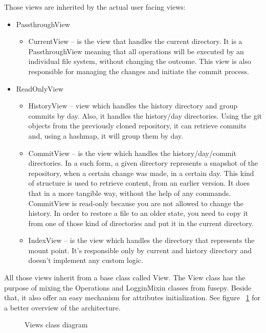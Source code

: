 Those views are inherited by the actual user facing views:
\begin{itemize}
    \item PassthroughView
    \begin{itemize}
        \item CurrentView – is the view that handles the current directory. It is a PassthroughView meaning that all operations will be executed by an individual file system, without changing the outcome. This view is also responsible for managing the changes and initiate the commit process.
    \end{itemize}
    
    \item ReadOnlyView
    \begin{itemize}
        \item HistoryView – view which handles the history directory and group commits by day. Also, it handles the history/{day} directories. Using the git objects from the previously cloned repository, it can retrieve commits and, using a hashmap, it will group them by day.
        \item CommitView – is the view which handles the history/{day}/{commit} directories. In a such form, a given directory represents a snapshot of the repository, when a certain change was made, in a certain day. This kind of structure is used to retrieve content, from an earlier version. It does that in a more tangible way, without the help of any commands. CommitView is read-only because you are not allowed to change the history. In order to restore a file to an older state, you need to copy it from one of those kind of directories and put it in the current directory.
        \item IndexView – is the view which handles the directory that represents the mount point. It's responsible only by current and history directory and doesn't implement any custom logic.
    \end{itemize}
\end{itemize}

All those views inherit from a base class called View. The View class has the purpose of mixing the Operations and LogginMixin classes from fusepy. Beside that, it also offer an easy mechanism for attributes initialization. See figure ~\ref{fig:views_diagram} for a better overview of the architecture.

\begin{figure}[h]
  \begin{center}
    \def\svgwidth{\columnwidth}
    
  \end{center}
  \caption{Views class diagram}
  \label{fig:views_diagram}
\end{figure}

